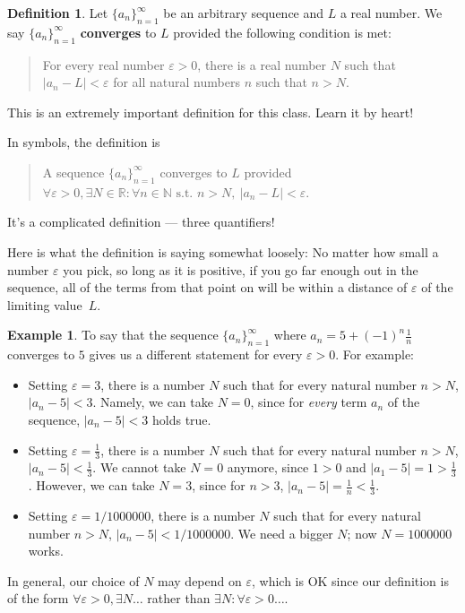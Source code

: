 \documentclass[12pt]{amsart}
\def\e{\varepsilon}
\newcommand{\R}{{\mathbb{R}}}
\newcommand{\N}{\mathbb{N}}
\numberwithin{equation}{section}
\theoremstyle{plain} %
\theoremstyle{definition}
\newtheorem{defn}[equation]{Definition}
\newtheorem{ex}[equation]{Example}
\theoremstyle{remark}
\begin{document}
\begin{defn} Let $\{a_n\}_{n=1}^\infty$ be an arbitrary sequence and $L$ a real number. We say $\{a_n\}_{n=1}^\infty$ {\bf converges} to $L$ provided the
  following condition is met:
\begin{quote}
For every real number $\e > 0$, there is a real number $N$ such that ${|a_n - L| < \e}$ for all natural numbers $n$ such that $n > N$.
\end{quote}
\end{defn}

This is an extremely important definition for this class. Learn it by heart!





In symbols, the definition is 
\begin{quote}
A sequence $\{a_n\}_{n=1}^\infty$ converges to $L$ provided\\
$\forall \e >0, {\exists N \in \R} : {\forall n \in \N} \text{ s.t. } n > N, \ {|a_n - L| < \e}$. 
\end{quote}

It's a complicated definition --- three quantifiers!


Here is what the definition is saying somewhat loosely: No matter how small a number $\e$ you pick, so long as it is positive, if you go far enough out in the sequence, all of
the terms from that point on will be within a distance of $\e$ of the limiting value~$L$.

\begin{ex} To say that the sequence $\{a_n\}_{n=1}^\infty$ where $a_n =  5 + (-1)^n \frac{1}{n}$ converges to $5$ gives us a different statement for every $\e>0$. For example:
\begin{itemize}
\item Setting $\e=3$, there is a number $N$ such that for every natural number $n>N$, $|a_n-5|<3$. Namely, we can take $N=0$, since for \emph{every} term $a_n$ of the sequence, $|a_n-5|<3$ holds true.
\item Setting $\e=\frac13$, there is a number $N$ such that for every natural number $n>N$, $|a_n-5|<\frac13$. We cannot take $N=0$ anymore, since $1>0$ and $|a_1-5|=1>\frac13$. However, we can take $N=3$, since for $n>3$, $|a_n-5|=\frac1n <\frac13$.
\item Setting $\e=1/1000000$, there is a number $N$ such that for every natural number $n>N$, $|a_n-5|<1/1000000$. We need a bigger $N$; now $N=1000000$ works.
\end{itemize}

In general, our choice of $N$ may depend on $\e$, which is OK since our definition is of the form $\forall \e>0,\exists N\dots$ rather than $\exists N:\forall \e>0\dots$.
\end{ex}
\end{document}
